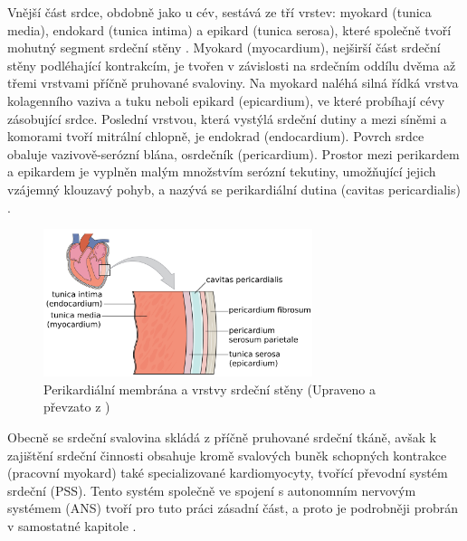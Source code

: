 Vnější část srdce, obdobně jako u cév, sestává ze tří vrstev: myokard (tunica
media), endokard (tunica intima) a epikard (tunica serosa), které společně tvoří
mohutný segment srdeční stěny \cite{Memorix2017}. Myokard (myocardium), nejširší
část srdeční stěny podléhající kontrakcím, je tvořen v závislosti na srdečním
oddílu dvěma až třemi vrstvami příčně pruhované svaloviny. Na myokard naléhá
silná řídká vrstva kolagenního vaziva a tuku neboli epikard (epicardium), ve
které probíhají cévy zásobující srdce. Poslední vrstvou, která vystýlá srdeční
dutiny a mezi síněmi a komorami tvoří mitrální chlopně, je endokrad
(endocardium). Povrch srdce obaluje vazivově-serózní blána, osrdečník
(pericardium). Prostor mezi perikardem a epikardem je vyplněn malým množstvím
serózní tekutiny, umožňující jejich vzájemný klouzavý pohyb, a nazývá se
perikardiální dutina (cavitas pericardialis) \cite{Weinhaus2005,Dylevsky2013}.

\begin{figure}[h]
	\begin{center}
		\includegraphics[width=0.7\textwidth]{../assets/anatomy/heart_muscle}
		\caption{Perikardiální membrána a vrstvy srdeční stěny (Upraveno a
			převzato z \cite{OpenStax})}
		\label{fig:heartlayers}
	\end{center}
\end{figure}

Obecně se srdeční svalovina skládá z příčně pruhované srdeční tkáně, avšak k
zajištění srdeční činnosti obsahuje kromě svalových buněk schopných kontrakce
(pracovní myokard) také specializované kardiomyocyty, tvořící převodní systém
srdeční (PSS). Tento systém společně ve spojení s autonomním nervovým systémem
(ANS) tvoří pro tuto práci zásadní část, a proto je podrobněji probrán v
samostatné kapitole \cite{Memorix2017,Dylevsky2013}.

